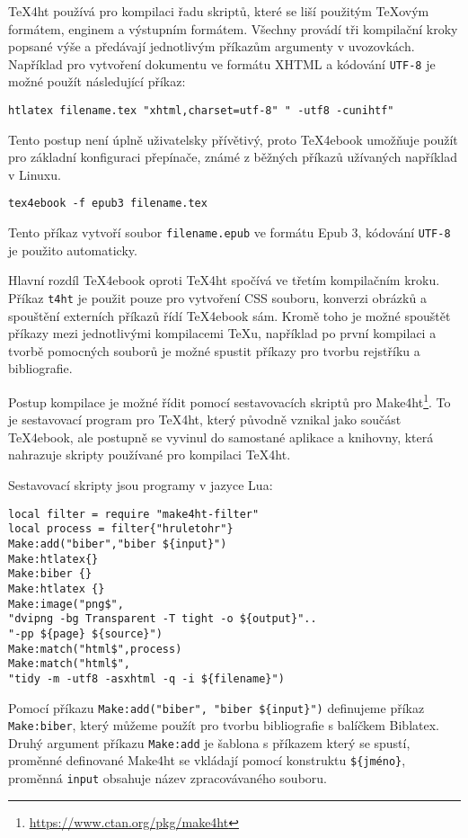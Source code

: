 \documentclass{csbulletin}
\newcommand\footlink[1]{\footnote{\url{#1}}}
\begin{document}
TeX4ht používá pro kompilaci řadu skriptů, které se liší použitým \TeX ovým
formátem, enginem a výstupním formátem. Všechny provádí tři kompilační kroky
popsané výše a předávají jednotlivým příkazům argumenty v uvozovkách.
Například pro vytvoření dokumentu ve formátu XHTML a kódování \texttt{UTF-8} je
možné použít následující příkaz: 
  
\begin{verbatim}
htlatex filename.tex "xhtml,charset=utf-8" " -utf8 -cunihtf"
\end{verbatim}

Tento postup není úplně uživatelsky přívětivý, proto TeX4ebook umožňuje
použít pro základní konfiguraci přepínače, známé z běžných příkazů užívaných
například v Linuxu.

\begin{verbatim}
tex4ebook -f epub3 filename.tex
\end{verbatim}

Tento příkaz vytvoří soubor \texttt{filename.epub} ve formátu Epub 3, kódování
\texttt{UTF-8} je použito automaticky. 

Hlavní rozdíl TeX4ebook oproti TeX4ht spočívá ve třetím kompilačním kroku.
Příkaz \texttt{t4ht} je použit pouze pro vytvoření CSS souboru, konverzi
obrázků a spouštění externích příkazů řídí TeX4ebook sám. Kromě toho je možné
spouštět příkazy mezi jednotlivými kompilacemi \TeX u, například po první
kompilaci a tvorbě pomocných souborů je možné spustit příkazy pro tvorbu
rejstříku a bibliografie. 

Postup kompilace je možné řídit pomocí sestavovacích skriptů pro
Make4ht\footlink{https://www.ctan.org/pkg/make4ht}. To je sestavovací program
pro TeX4ht, který původně vznikal jako součást TeX4ebook, ale postupně se
vyvinul do samostané aplikace a knihovny, která nahrazuje skripty používané pro
kompilaci TeX4ht.

Sestavovací skripty jsou programy v jazyce Lua:

\begin{verbatim}
local filter = require "make4ht-filter"
local process = filter{"hruletohr"}
Make:add("biber","biber ${input}")
Make:htlatex{}
Make:biber {}
Make:htlatex {}
Make:image("png$",                                                          
"dvipng -bg Transparent -T tight -o ${output}"..
"-pp ${page} ${source}")
Make:match("html$",process)
Make:match("html$",
"tidy -m -utf8 -asxhtml -q -i ${filename}")
\end{verbatim}


Pomocí příkazu \verb|Make:add("biber", "biber ${input}")| definujeme příkaz
\verb|Make:biber|, který můžeme použít  pro tvorbu bibliografie s balíčkem
Biblatex. Druhý argument příkazu \verb|Make:add| je šablona s příkazem který se
spustí, proměnné definované Make4ht se vkládají pomocí konstruktu
\verb|${jméno}|, proměnná \texttt{input} obsahuje název zpracovávaného souboru.
\end{document}
